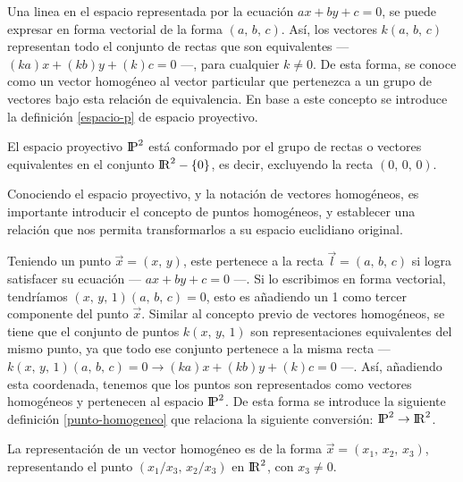 Una linea en el espacio representada por la ecuación $ax + by + c = 0$, se puede expresar en forma vectorial de la forma $(a,\, b,\, c)$. Así, los vectores $k(a,\, b,\, c)$ representan todo el conjunto de rectas que son equivalentes --- $(ka)x + (kb)y + (k)c = 0$ ---, para cualquier $k\neq0$. De esta forma, se conoce como un vector homogéneo al vector particular que pertenezca a un grupo de vectores bajo esta relación de equivalencia. En base a este concepto se introduce la definición \ref{espacio-p} de espacio proyectivo.

\begin{displayquote}
	\vspace{-1.5cm}
	\begin{definition}
		El espacio proyectivo ${\rm I\!P}^2$ está conformado por el grupo de rectas o vectores equivalentes en el conjunto ${\rm I\!R}^2-\{0\}$, es decir, excluyendo la recta $(0,\, 0,\, 0)$.
		\label{espacio-p}
	\end{definition}
\end{displayquote}

Conociendo el espacio proyectivo, y la notación de vectores homogéneos, es importante introducir el concepto de puntos homogéneos, y establecer una relación que nos permita transformarlos a su espacio euclidiano original. 

Teniendo un punto $\vec{x}=(x,\, y)$, este pertenece a la recta $\vec{l}=(a,\, b,\, c)$ si logra satisfacer su ecuación --- $ax + by + c = 0$ ---. Si lo escribimos en forma vectorial, tendríamos $(x,\, y,\, 1)(a,\, b,\, c) = 0$, esto es añadiendo un 1 como tercer componente del punto $\vec{x}$. Similar al concepto previo de vectores homogéneos, se tiene que el conjunto de puntos $k(x,\, y,\, 1)$ son representaciones equivalentes del mismo punto, ya que todo ese conjunto pertenece a la misma recta --- $k(x,\, y,\, 1)(a,\, b,\, c) = 0 \to (ka)x + (kb)y + (k)c = 0$ ---. Así, añadiendo esta coordenada, tenemos que los puntos son representados como vectores homogéneos y pertenecen al espacio ${\rm I\!P}^2$. De esta forma se introduce la siguiente definición \ref{punto-homogeneo} que relaciona la siguiente conversión: ${\rm I\!P}^2 \to {\rm I\!R}^2$.
\begin{displayquote}
	\vspace{-1.5cm}
	\begin{definition}
		La representación de un vector homogéneo es de la forma $\vec{x} = (x_1,\, x_2,\, x_3)$, representando el punto $(x_1/x_3,\, x_2/x_3)$ en ${\rm I\!R}^2$, con $x_3 \neq 0$.
	\end{definition} 
	\label{punto-homogeneo}
\end{displayquote}

